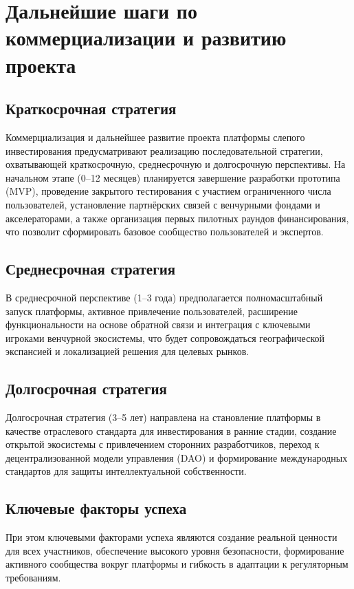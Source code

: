 \documentclass[
    candidate, %
    subf, %
    dotsinheaders=false,
]{disser}
\begin{document}
\section{Дальнейшие шаги по коммерциализации и развитию проекта}

\subsection{Краткосрочная стратегия}
Коммерциализация и дальнейшее развитие проекта платформы слепого инвестирования предусматривают реализацию последовательной стратегии, охватывающей краткосрочную, среднесрочную и долгосрочную перспективы. На начальном этапе (0–12 месяцев) планируется завершение разработки прототипа (MVP), проведение закрытого тестирования с участием ограниченного числа пользователей, установление партнёрских связей с венчурными фондами и акселераторами, а также организация первых пилотных раундов финансирования, что позволит сформировать базовое сообщество пользователей и экспертов.

\subsection{Среднесрочная стратегия}
В среднесрочной перспективе (1–3 года) предполагается полномасштабный запуск платформы, активное привлечение пользователей, расширение функциональности на основе обратной связи и интеграция с ключевыми игроками венчурной экосистемы, что будет сопровождаться географической экспансией и локализацией решения для целевых рынков.

\subsection{Долгосрочная стратегия}
Долгосрочная стратегия (3–5 лет) направлена на становление платформы в качестве отраслевого стандарта для инвестирования в ранние стадии, создание открытой экосистемы с привлечением сторонних разработчиков, переход к децентрализованной модели управления (DAO) и формирование международных стандартов для защиты интеллектуальной собственности.

\subsection{Ключевые факторы успеха}
При этом ключевыми факторами успеха являются создание реальной ценности для всех участников, обеспечение высокого уровня безопасности, формирование активного сообщества вокруг платформы и гибкость в адаптации к регуляторным требованиям.
\end{document}
